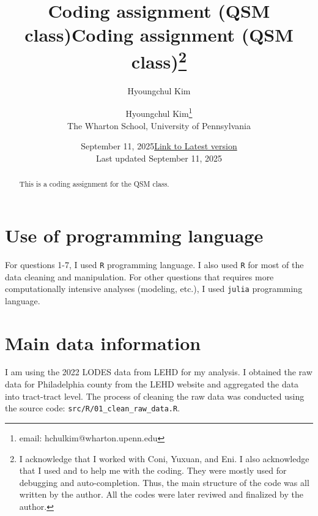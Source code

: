 \documentclass[
  11pt]{article}
\title{Coding assignment (QSM class)}
\author{Hyoungchul Kim}
\date{September 11, 2025}
\begin{document}
\def\spacingset#1{\renewcommand{\baselinestretch}%
{#1}\small\normalsize} \spacingset{1}



\date{\href{https://github.com/hchulkim/qsm-class/blob/main/output/output.pdf}{Link to Latest version}\\ \vspace{1em}  Last updated September
11, 2025}
\title{Coding assignment (QSM class)\thanks{I acknowledge that I worked
with Coni, Yuxuan, and Eni. I also acknowledge that I used
\citet{chatgpt} and \citet{cursor} to help me with the coding. They were
mostly used for debugging and auto-completion. Thus, the main structure
of the code was all written by the author. All the codes were later
reviwed and finalized by the author.}}
\author{
Hyoungchul Kim\thanks{email: hchulkim@wharton.upenn.edu}\\
The Wharton School, University of Pennsylvania\\
}
\maketitle

\bigskip
\bigskip
\begin{abstract}
This is a coding assignment for the QSM class.
\end{abstract}

\bigskip

\newpage
\spacingset{1.2} %

\section{Use of programming
language}\label{sec-use-of-programming-language}

For questions 1-7, I used \texttt{R} programming language. I also used
\texttt{R} for most of the data cleaning and manipulation. For other
questions that requires more computationally intensive analyses
(modeling, etc.), I used \texttt{julia} programming language.

\section{Main data information}\label{sec-main-data-info}

I am using the 2022 LODES data from LEHD for my analysis. I obtained the
raw data for Philadelphia county from the LEHD website and aggregated
the data into tract-tract level. The process of cleaning the raw data
was conducted using the source code:
\texttt{src/R/01\_clean\_raw\_data.R}.
\end{document}

